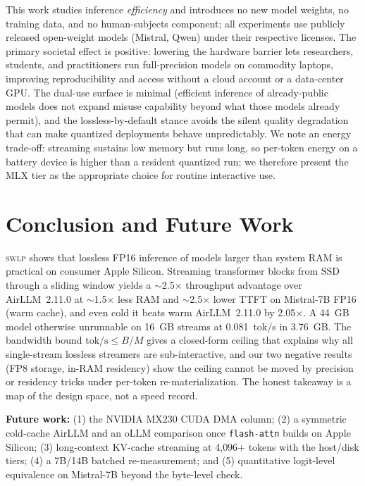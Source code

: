 \documentclass[10pt,a4paper]{article}
\newcommand{\swlp}{\textsc{swlp}}
\begin{document}
This work studies inference \emph{efficiency} and introduces no new model weights,
no training data, and no human-subjects component; all experiments use publicly
released open-weight models (Mistral, Qwen) under their respective licenses. The
primary societal effect is positive: lowering the hardware barrier lets
researchers, students, and practitioners run full-precision models on commodity
laptops, improving reproducibility and access without a cloud account or a
data-center GPU. The dual-use surface is minimal (efficient inference of
already-public models does not expand misuse capability beyond what those models
already permit), and the lossless-by-default stance avoids the silent quality
degradation that can make quantized deployments behave unpredictably. We note an
energy trade-off: streaming sustains low memory but runs long, so per-token energy
on a battery device is higher than a resident quantized run; we therefore present
the MLX tier as the appropriate choice for routine interactive use.

\section{Conclusion and Future Work}
\label{sec:conclusion}

\swlp{} shows that lossless FP16 inference of models larger than system RAM is
practical on consumer Apple Silicon. Streaming transformer blocks from SSD through
a sliding window yields a $\sim$2.5$\times$ throughput advantage over
AirLLM~2.11.0 at $\sim$1.5$\times$ less RAM and $\sim$2.5$\times$
lower TTFT on Mistral-7B FP16 (warm cache), and even cold it beats warm
AirLLM~2.11.0 by 2.05$\times$. A 44~GB model otherwise unrunnable on 16~GB streams at 0.081~tok/s in
3.76~GB. The bandwidth bound $\text{tok/s}\le B/M$ gives a closed-form ceiling that
explains why all single-stream lossless streamers are sub-interactive, and our two
negative results (FP8 storage, in-RAM residency) show the ceiling cannot be moved
by precision or residency tricks under per-token re-materialization. The honest
takeaway is a map of the design space, not a speed record.

\textbf{Future work:} (1) the NVIDIA MX230 CUDA DMA column; (2) a symmetric
cold-cache AirLLM and an oLLM comparison once \texttt{flash-attn} builds on Apple
Silicon; (3) long-context KV-cache streaming at 4{,}096+ tokens with the
host/disk tiers; (4) a 7B/14B batched re-measurement; and (5) quantitative
logit-level equivalence on Mistral-7B beyond the byte-level check.
\end{document}
